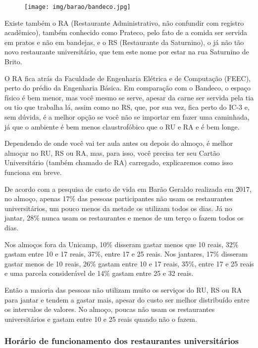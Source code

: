 \begin{figure}[h!]
  \centering
  \texttt{[image: img/barao/bandeco.jpg]}
\end{figure}

Existe também o RA (Restaurante Administrativo, não confundir com registro
acadêmico), também conhecido como Prateco, pelo fato de a comida ser servida
em pratos e não em bandejas, e o RS (Restaurante da Saturnino), o já não tão
novo restaurante universitário, que tem este nome por estar na rua Saturnino de
Brito.

O RA fica atrás da Faculdade de Engenharia Elétrica e de Computação (FEEC),
perto do prédio da Engenharia Básica. Em comparação com o Bandeco, o espaço
físico é bem menor, mas você mesmo se serve, apesar da carne ser servida pela
tia ou tio que trabalha lá, assim como no RS, que, por sua vez, fica perto do
IC-3 e, sem dúvida, é a melhor opção se você não se importar em fazer uma
caminhada, já que o ambiente é bem menos claustrofóbico que o RU e RA e é bem
longe.

Dependendo de onde você vai ter aula antes ou depois do almoço, é melhor
almoçar no RU, RS ou RA, mas, para isso, você precisa ter seu Cartão
Universitário (também chamado de RA) carregado, explicaremos como isso funciona
em breve.

De acordo com a pesquisa de custo de vida em Barão Geraldo realizada em 2017,
no almoço, apenas 17\% das pessoas participantes não usam os restaurantes
universitários, um pouco menos da metade os utilizam todos os dias. Já no
jantar, 28\% nunca usam os restaurantes e menos de um terço o fazem todos os
dias.

Nos almoços fora da Unicamp, 10\% disseram gastar menos que 10 reais, 32\%
gastam entre 10 e 17 reais, 37\%, entre 17 e 25 reais. Nos jantares, 17\%
disseram gastar menos de 10 reais, 26\% gastam entre 10 e 17 reais, 35\%,
entre 17 e 25 reais e uma parcela considerável de 14\% gastam entre 25 e 32
reais.

Então a maioria das pessoas não utilizam muito os serviços do RU, RS ou RA para
jantar e tendem a gastar mais, apesar do custo ser melhor distribuído entre os
intervalos de valores. No almoço, poucas não usam os restaurantes
universitários e gastam entre 10 e 25 reais quando não o fazem.

\subsubsection{Horário de funcionamento dos restaurantes universitários}

